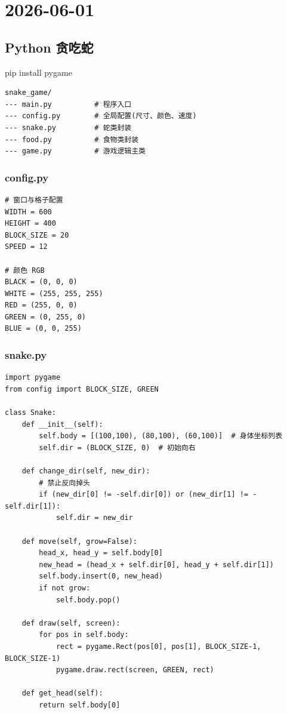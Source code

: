 \section*{2026-06-01}

\subsection*{Python 贪吃蛇}

pip install pygame \par

\lstset{language=bash}
\begin{lstlisting}
snake_game/
--- main.py          # 程序入口
--- config.py        # 全局配置(尺寸、颜色、速度)
--- snake.py         # 蛇类封装
--- food.py          # 食物类封装
--- game.py          # 游戏逻辑主类
\end{lstlisting}

\subsubsection*{config.py}
\lstset{language=Python}
\begin{lstlisting}
# 窗口与格子配置
WIDTH = 600
HEIGHT = 400
BLOCK_SIZE = 20
SPEED = 12

# 颜色 RGB
BLACK = (0, 0, 0)
WHITE = (255, 255, 255)
RED = (255, 0, 0)
GREEN = (0, 255, 0)
BLUE = (0, 0, 255)
\end{lstlisting}

\subsubsection*{snake.py}
\lstset{language=Python}
\begin{lstlisting}
import pygame
from config import BLOCK_SIZE, GREEN

class Snake:
    def __init__(self):
        self.body = [(100,100), (80,100), (60,100)]  # 身体坐标列表
        self.dir = (BLOCK_SIZE, 0)  # 初始向右

    def change_dir(self, new_dir):
        # 禁止反向掉头
        if (new_dir[0] != -self.dir[0]) or (new_dir[1] != -self.dir[1]):
            self.dir = new_dir

    def move(self, grow=False):
        head_x, head_y = self.body[0]
        new_head = (head_x + self.dir[0], head_y + self.dir[1])
        self.body.insert(0, new_head)
        if not grow:
            self.body.pop()

    def draw(self, screen):
        for pos in self.body:
            rect = pygame.Rect(pos[0], pos[1], BLOCK_SIZE-1, BLOCK_SIZE-1)
            pygame.draw.rect(screen, GREEN, rect)

    def get_head(self):
        return self.body[0]
\end{lstlisting}

